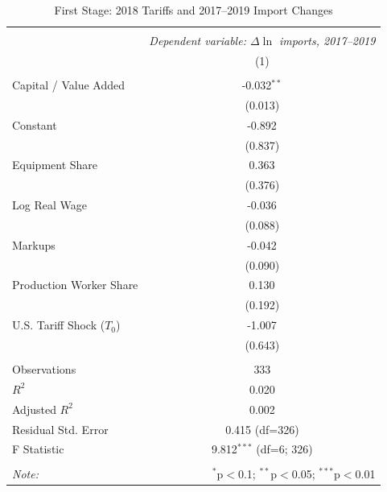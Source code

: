\begin{table}[!htbp] \centering
  \caption{First Stage: 2018 Tariffs and 2017--2019 Import Changes}
  \label{tab:first_stage}
\begin{tabular}{@{\extracolsep{5pt}}lc}
\\[-1.8ex]\hline
\hline \\[-1.8ex]
& \multicolumn{1}{c}{\textit{Dependent variable: $\Delta \ln$ imports, 2017--2019}} \
\cr \cline{2-2}
\\[-1.8ex] & (1) \\
\hline \\[-1.8ex]
 Capital / Value Added & -0.032$^{**}$ \\
& (0.013) \\
 Constant & -0.892$^{}$ \\
& (0.837) \\
 Equipment Share & 0.363$^{}$ \\
& (0.376) \\
 Log Real Wage & -0.036$^{}$ \\
& (0.088) \\
 Markups & -0.042$^{}$ \\
& (0.090) \\
 Production Worker Share & 0.130$^{}$ \\
& (0.192) \\
 U.S. Tariff Shock ($T_0$) & -1.007$^{}$ \\
& (0.643) \\
\hline \\[-1.8ex]
 Observations & 333 \\
 $R^2$ & 0.020 \\
 Adjusted $R^2$ & 0.002 \\
 Residual Std. Error & 0.415 (df=326) \\
 F Statistic & 9.812$^{***}$ (df=6; 326) \\
\hline
\hline \\[-1.8ex]
\textit{Note:} & \multicolumn{1}{r}{$^{*}$p$<$0.1; $^{**}$p$<$0.05; $^{***}$p$<$0.01} \\
\end{tabular}
\end{table}